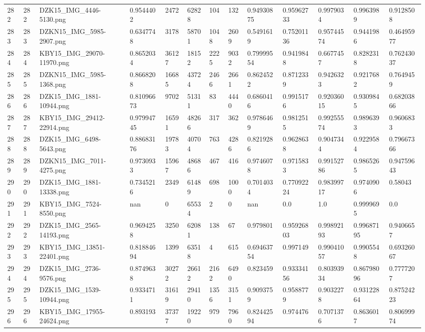 \documentclass[11pt, a4paper, twoside]{report}
\begin{document}
\begin{longtable}[c]{@{}lllllllllllll@{}}
282 & 282 & DZK15\_IMG\_4446-5130.png & 0.9544402 & 2472 & 62828 & 104 & 132 & 0.94930875 & 0.95962733 & 0.9979034 & 0.9963989 & 0.9128508 \\
283 & 283 & DZKN15\_IMG\_5985-2907.png & 0.6347748 & 3178 & 58701 & 1048 & 2609 & 0.5491619 & 0.75201136 & 0.95744574 & 0.9441986 & 0.46495977 \\
284 & 284 & KBY15\_IMG\_29070-11970.png & 0.8652034 & 36127 & 18152 & 2225 & 9032 & 0.79999554 & 0.9419848 & 0.6677457 & 0.8282318 & 0.76243037 \\
285 & 285 & DZKN15\_IMG\_5985-1368.png & 0.8668208 & 16685 & 43724 & 2466 & 2661 & 0.8624522 & 0.8712339 & 0.9426323 & 0.9217682 & 0.7649459 \\
286 & 286 & DZK15\_IMG\_1881-10944.png & 0.81096673 & 9702 & 51311 & 83 & 4440 & 0.6860416 & 0.9915176 & 0.92036015 & 0.9309845 & 0.68203866 \\
287 & 287 & KBY15\_IMG\_29412-22914.png & 0.97994745 & 16591 & 48266 & 317 & 362 & 0.9786469 & 0.9812515 & 0.99255574 & 0.9896393 & 0.9606833 \\
288 & 288 & DZK15\_IMG\_6498-5643.png & 0.88683176 & 19783 & 40704 & 763 & 4286 & 0.8219286 & 0.9628638 & 0.9047344 & 0.9229584 & 0.79667366 \\
289 & 289 & DZKN15\_IMG\_7011-4275.png & 0.9730933 & 15967 & 48686 & 467 & 416 & 0.9746078 & 0.9715833 & 0.99152786 & 0.9865265 & 0.94759643 \\
290 & 290 & DZK15\_IMG\_1881-13338.png & 0.7345216 & 2349 & 61489 & 698 & 1000 & 0.7014034 & 0.77092224 & 0.98399717 & 0.9740906 & 0.58043 \\
291 & 291 & KBY15\_IMG\_7524-8550.png & nan & 0 & 65534 & 2 & 0 & nan & 0.0 & 1.0 & 0.9999695 & 0.0 \\
292 & 292 & DZK15\_IMG\_2565-14193.png & 0.9694258 & 3250 & 62081 & 138 & 67 & 0.979801 & 0.95926803 & 0.99892193 & 0.99687195 & 0.9406657 \\
293 & 293 & KBY15\_IMG\_13851-22401.png & 0.81884694 & 1399 & 63518 & 4 & 615 & 0.69463754 & 0.997149 & 0.99041057 & 0.9905548 & 0.69326067 \\
294 & 294 & DZK15\_IMG\_2736-9576.png & 0.8749638 & 30272 & 26612 & 2162 & 6490 & 0.823459 & 0.93334156 & 0.80393934 & 0.86798096 & 0.7777207 \\
295 & 295 & DZK15\_IMG\_1539-10944.png & 0.9334711 & 31619 & 29410 & 1356 & 3151 & 0.9093759 & 0.9588779 & 0.9032278 & 0.93122864 & 0.87524223 \\
296 & 296 & KBY15\_IMG\_17955-24624.png & 0.893193 & 37377 & 19220 & 979 & 7960 & 0.82442594 & 0.974476 & 0.7071376 & 0.8636017 & 0.80699974 \\

\end{longtable}
\end{document}
